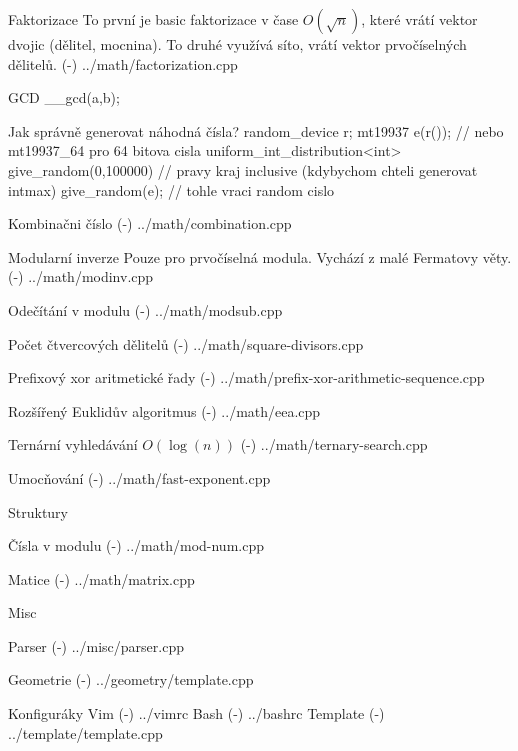 \sec Faktorizace
To první je basic faktorizace v čase $O(\sqrt n)$, které vrátí vektor dvojic (dělitel, mocnina). To druhé využívá síto, vrátí vektor prvočíselných dělitelů.
\verbinput (-) ../math/factorization.cpp

\sec GCD
\begtt
__gcd(a,b);
\endtt

\sec Jak správně generovat náhodná čísla?
\begtt
  random_device r;
  mt19937 e(r()); // nebo mt19937_64 pro 64 bitova cisla
  uniform_int_distribution<int> give_random(0,100000) // pravy kraj inclusive (kdybychom chteli generovat intmax)
  give_random(e); // tohle vraci random cislo
\endtt

\sec Kombinačni číslo
\verbinput (-) ../math/combination.cpp

\sec Modularní inverze
Pouze pro prvočíselná modula. Vychází z malé Fermatovy věty.
\verbinput (-) ../math/modinv.cpp

\sec Odečítání v modulu
\verbinput (-) ../math/modsub.cpp

\sec Počet čtvercových dělitelů
\verbinput (-) ../math/square-divisors.cpp

\sec Prefixový xor aritmetické řady
\verbinput (-) ../math/prefix-xor-arithmetic-sequence.cpp

\sec Rozšířený Euklidův algoritmus
\verbinput (-) ../math/eea.cpp

\sec Ternární vyhledávání
$O(\log(n))$
\verbinput (-) ../math/ternary-search.cpp

\sec Umocňování
\verbinput (-) ../math/fast-exponent.cpp

\sec Struktury

\secc Čísla v modulu
\verbinput (-) ../math/mod-num.cpp

\secc Matice
\verbinput (-) ../math/matrix.cpp

\newpage

\chap Misc

\sec Parser
\verbinput (-) ../misc/parser.cpp

\newpage

\chap Geometrie
\verbinput (-) ../geometry/template.cpp

\newpage

\chap Konfiguráky
\sec Vim
\verbinput (-) ../vimrc
\sec Bash
\verbinput (-) ../bashrc
\sec Template
\verbinput (-) ../template/template.cpp

\bye
